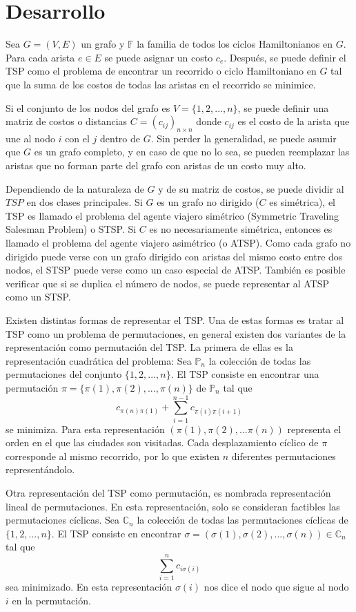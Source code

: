 \section*{Desarrollo}
Sea $G=(V,E)$ un grafo y $\mathbb{F}$ la familia de todos los ciclos Hamiltonianos en $G$. Para cada arista $e\in E$ se puede asignar un costo  $c_e$. Después, se puede definir el TSP como el problema de encontrar un recorrido o ciclo Hamiltoniano en $G$ tal que la suma de los costos de todas las aristas en el recorrido se minimice.
\par Si el conjunto de los nodos del grafo es $V=\{1, 2, ..., n\}$, se puede definir una matriz de costos o distancias $C =(c_{ij})_{n\times n}$ donde $c_{ij}$ es el costo de la arista que une al nodo $i$ con el $j$ dentro de $G$. Sin perder la generalidad, se puede asumir que $G$ es un grafo completo, y en caso de que no lo sea, se pueden reemplazar las aristas que no forman parte del grafo con aristas de un costo muy alto.
\par Dependiendo de la naturaleza de $G$ y de su matriz de costos, se puede dividir al $TSP$ en dos clases principales. Si $G$ es un grafo no dirigido ($C$ es simétrica), el TSP es llamado el problema del agente viajero simétrico (Symmetric Traveling Salesman Problem) o STSP. Si $C$ es no necesariamente simétrica, entonces es llamado el problema del agente viajero asimétrico (o ATSP). Como cada grafo no dirigido puede verse con un grafo dirigido con aristas del mismo costo entre dos nodos, el STSP puede verse como un caso especial de ATSP. También es posible verificar que si se duplica el número de nodos, se puede representar al ATSP como un STSP.
\par Existen distintas formas de representar el TSP. Una de estas formas es tratar al TSP como un problema de permutaciones, en general existen dos variantes de la representación como permutación del TSP. La primera de ellas es la representación cuadrática del problema: Sea $\mathbb{P}_n$  la colección de todas las permutaciones del conjunto $\{1, 2,..., n\}$. El TSP consiste en encontrar una permutación $\pi = \{\pi(1), \pi(2), ..., \pi(n)\}$ de $\mathbb{P}_n$ tal que
$$
c_{\pi(n)\pi(1)} + \sum\limits_{i=1}^{n-1}c_{\pi(i)\pi(i+1)}
$$
se minimiza. Para esta representación $(\pi(1), \pi(2), ...\pi(n))$ representa el orden en el que las ciudades son visitadas. Cada desplazamiento cíclico de $\pi$ corresponde al mismo recorrido, por lo que existen $n$ diferentes permutaciones representándolo.
\par Otra representación del TSP como permutación, es nombrada representación lineal de permutaciones. En esta representación, solo se consideran factibles las permutaciones cíclicas. Sea $\mathbb{C}_n$ la colección de todas las permutaciones cíclicas de $\{1, 2, ..., n\}$. El TSP consiste en encontrar $\sigma = (\sigma(1), \sigma(2), ..., \sigma(n))\in\mathbb{C}_n$ tal que
$$
	\sum\limits_{i=1}^{n}c_{i\sigma(i)}
$$
sea minimizado. En esta representación $\sigma(i)$ nos dice el nodo que sigue al nodo $i$ en la permutación.
